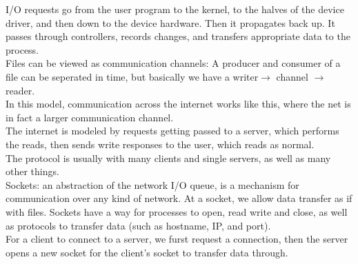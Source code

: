 \documentclass[paper=a4, fontsize=11pt]{scrartcl} %
\numberwithin{equation}{section} %
\numberwithin{figure}{section} %
\numberwithin{table}{section} %
\begin{document}
I/O requests go from the user program to the kernel, to the halves of the device driver, and then down to the device hardware. Then it propagates back up. It passes through controllers, records changes, and transfers appropriate data to the process. \\
Files can be viewed as communication channels: A producer and consumer of a file can be seperated in time, but basically we have a writer$\rightarrow$ channel $\rightarrow$ reader. \\
In this model, communication across the internet works like this, where the net is in fact a larger communication channel. \\
The internet is modeled by requests getting passed to a server, which performs the reads, then sends write responses to the user, which reads as normal. \\
The protocol is usually with many clients and single servers, as well as many other things. \\
Sockets: an abstraction of the network I/O queue, is a mechanism for communication over any kind of network. At a socket, we allow data transfer as if with files. Sockets have a way for processes to open, read write and close, as well as protocols to transfer data (such as hostname, IP, and port).\\
For a client to connect to a server, we furst request a connection, then the server opens a new socket for the client's socket to transfer data through. \\
\end{document}
